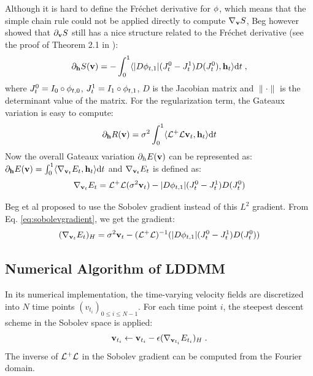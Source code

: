 \documentclass[letterpaper,12pt]{article}
\begin{document}
Although it is hard to define the Fr{\'e}chet derivative for $\phi$, which means that the simple chain rule could not be applied directly to compute $\nabla_{\mathbf{v}} S$, Beg however showed that $\partial_{\mathbf{v}} S$ still has a nice structure related to the Fr\'echet derivative (see the proof of Theorem 2.1 in \cite{Beg2005Computing}):
\begin{align}
\partial_{\mathbf{h}} S(\mathbf{v}) = - \int_{0}^{1} 
\langle
|D\phi_{t,1}|
(J_t^0 - J_t^1)
D(J_t^0)
,
\mathbf{h}_t
\rangle
\text{d} t \; ,
\label{eq:lddmmds}
\end{align}
where $J_t^0 = I_{0}\circ \phi_{t,0}$, $J_t^1 = I_{1}\circ \phi_{t,1}$, $D$ is the Jacobian matrix and $\| \cdot \|$ is the determinant value of the matrix.
For the regularization term, the Gateaux variation is easy to compute:
\begin{align}
\partial_{\mathbf{h}} R(\mathbf{v}) = \sigma^2 \int_{0}^{1} 
\langle
\mathcal{L}^+\mathcal{L} \mathbf{v}_t, \mathbf{h}_t
\rangle \text{d} t
\end{align}
Now the overall Gateaux variation $\partial_h E(\mathbf{v})$ can be represented as:
$\partial_{\mathbf{h}} E(\mathbf{v}) = \int_0^1
\langle
\nabla_{\mathbf{v}_t} E_t , \mathbf{h}_t
\rangle \text{d} t $
and $\nabla_{\mathbf{v}_t} E_t$ is defined as:
\begin{align}
\nabla_{\mathbf{v}_t} E_t = \mathcal{L}^+\mathcal{L} (\sigma^2 \mathbf{v}_t) - |D\phi_{t,1}|(J_t^0 - J_t^1)D(J_t^0)
\label{eq:lddmmgrad}
\end{align}

Beg et al proposed to use the Sobolev gradient instead of this $L^2$ gradient. From Eq. \ref{eq:sobolevgradient}, we get the gradient:
\begin{align}
(\nabla_{\mathbf{v}_t} E_t)_H = \sigma^2 \mathbf{v}_t - (\mathcal{L}^+\mathcal{L})^{-1}(|D\phi_{t,1}|(J_t^0 - J_t^1)D(J_t^0))
\end{align}

\subsection{Numerical Algorithm of LDDMM}
\label{sec:lddmmalg}
In its numerical implementation, the time-varying velocity fields are discretized into $N$ time points $(v_{t_i} )_{0 \leq i \leq N-1}$. For each time point $i$, the steepest descent scheme in the Sobolev space is applied:
\begin{align}
\mathbf{v}_{t_i}  \leftarrow \mathbf{v}_{t_i} - \epsilon (\nabla_{\mathbf{v}_{t_i}} E_{t_i})_H \; .
\end{align}
The inverse of $\mathcal{L}^+\mathcal{L}$ in the Sobolev gradient can be computed from the Fourier domain.
\end{document}

